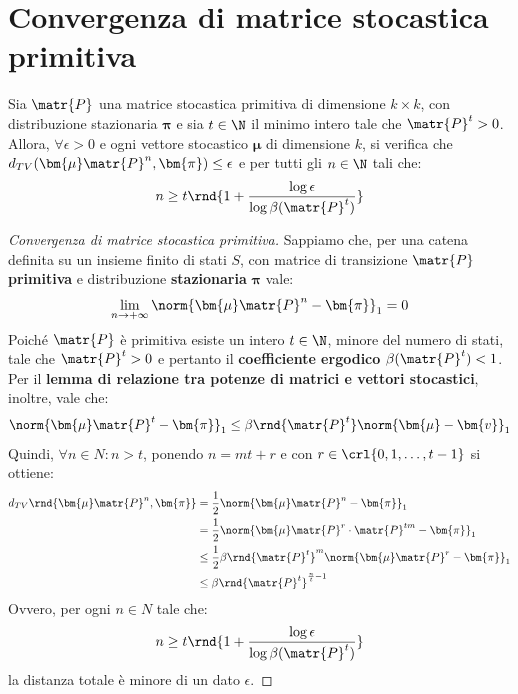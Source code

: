 \documentclass[\main/main.tex]{subfiles}
\begin{document}
\section{Convergenza di matrice stocastica primitiva}
\begin{theorem}
  Sia \(\matr{P}\) una matrice stocastica primitiva di dimensione \(k \times k\), con distribuzione stazionaria \(\bm{\pi} \) e sia \(t \in \N \) il minimo intero tale che \(\matr{P}^t > 0\). Allora, \(\forall \epsilon > 0\) e ogni vettore stocastico \(\bm{\mu} \) di dimensione \(k\), si verifica che \(d_{TV}(\bm{\mu}\matr{P}^n, \bm{\pi}) \leq \epsilon \) e per tutti gli \(n \in \N \) tali che:
  \[
    n \geq t\rnd{1+\frac{\log \epsilon}{\log \beta(\matr{P}^t)}}
  \]
\end{theorem}
\begin{proof}[Convergenza di matrice stocastica primitiva]
  Sappiamo che, per una catena definita su un insieme finito di stati \(S\), con matrice di transizione \(\matr{P}\) \textbf{primitiva} e distribuzione \textbf{stazionaria} \(\bm{\pi} \) vale:
  \[
    \lim_{n\rightarrow +\infty} \norm{\bm{\mu} \matr{P}^n - \bm{\pi}}_1 = 0
  \]
  Poiché \(\matr{P}\) è primitiva esiste un intero \(t \in \N \), minore del numero di stati, tale che \(\matr{P}^t > 0\) e pertanto il \textbf{coefficiente ergodico} \(\beta(\matr{P}^t) < 1\). Per il \textbf{lemma di relazione tra potenze di matrici e vettori stocastici}, inoltre, vale che:
  \[
    \norm{\bm{\mu}\matr{P}^t - \bm{\pi}}_1 \leq \beta\rnd{\matr{P}^t} \norm{\bm{\mu} - \bm{v}}_1
  \]
  Quindi, \(\forall n \in N: n > t\), ponendo \(n = mt + r\) e con \(r \in \crl{0, 1, \ldots, t-1}\) si ottiene:
  \begin{align*}
    d_{TV}\rnd{\bm{\mu}\matr{P}^n, \bm{\pi}} & = \frac{1}{2}\norm{\bm{\mu}\matr{P}^n - \bm{\pi}}_1                            \\
                                             & = \frac{1}{2}\norm{\bm{\mu}\matr{P}^r\cdot\matr{P}^{tm} - \bm{\pi}}_1                     \\
                                             & \leq \frac{1}{2}\beta\rnd{\matr{P}^t}^m \norm{\bm{\mu}\matr{P}^r - \bm{\pi}}_1 \\
                                             & \leq \beta\rnd{\matr{P}^t}^{\frac{n}{t}-1}
  \end{align*}
  Ovvero, per ogni \(n \in N\) tale che:
  \[
    n \geq t\rnd{1+\frac{\log \epsilon}{\log \beta(\matr{P}^t)}}
  \]
  la distanza totale è minore di un dato \(\epsilon \).
\end{proof}
\end{document}

